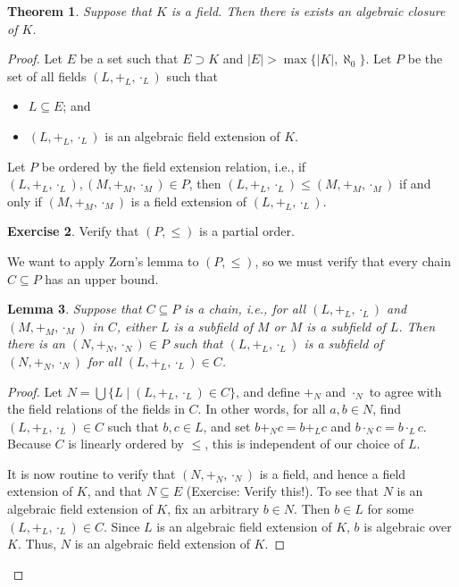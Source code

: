 \documentclass[a4paper]{memoir}
\newtheorem{theorem}{Theorem}[section]
\newtheorem{lemma}[theorem]{Lemma}
\theoremstyle{definition}
\newtheorem{exercise}[theorem]{Exercise}
\begin{document}
\begin{theorem}
  Suppose that $K$ is a field. Then there is exists an algebraic closure of $K$.
\end{theorem}

\begin{proof}
  Let $E$ be a set such that $E \supset K$ and $|E| > \max\{|K|, \aleph_0\}$. Let 
  $P$ be the set of all fields $(L, +_L, \cdot_L)$ such that
  \begin{itemize}
    \item $L \subseteq E$; and
    \item $(L, +_L, \cdot_L)$ is an algebraic field extension of $K$.
  \end{itemize}
  Let $P$ be ordered by the field extension relation, i.e., if 
  $(L, +_L, \cdot_L), (M, +_M, \cdot_M) \in P$, then $(L, +_L, \cdot_L) \leq 
  (M, +_M, \cdot_M)$ if and only if $(M, +_M, \cdot_M)$ is a field extension of 
  $(L, +_L, \cdot_L)$.
  
  \begin{exercise}
    Verify that $(P, \leq)$ is a partial order.
  \end{exercise}
  
  We want to apply Zorn's lemma to $(P, \leq)$, so we must verify that every 
  chain $C \subseteq P$ has an upper bound.
  
  \begin{lemma}
    Suppose that $C \subseteq P$ is a chain, i.e., for all $(L, +_L, \cdot_L)$ and 
    $(M, +_M, \cdot_M)$ in $C$, either $L$ is a subfield of $M$ or $M$ is a subfield of $L$.
    Then there is an $(N, +_N, \cdot_N) \in P$ such that 
    $(L, +_L, \cdot_L)$ is a subfield of $(N, +_N, \cdot_N)$ for all $(L, +_L, \cdot_L) \in C$.
  \end{lemma}
  
  \begin{proof}
    Let $N = \bigcup\{ L \mid (L, +_L, \cdot_L) \in C \}$, and define $+_N$ and $\cdot_N$ to 
    agree with the field relations of the fields in $C$. In other words, for all 
    $a,b \in N$, find $(L, +_L, \cdot_L) \in C$ such that $b,c \in L$, and set 
    $b +_N c = b +_L c$ and $b \cdot_N c = b \cdot_L c$. Because $C$ is linearly ordered 
    by $\leq$, this is independent of our choice of $L$. 
    
    It is now routine to verify that $(N, +_N, \cdot_N)$ is a field, and hence a field extension 
    of $K$, and that $N \subseteq E$ (Exercise: Verify this!). To see that $N$ is an 
    algebraic field extension of $K$, 
    fix an arbitrary $b \in N$. Then $b \in L$ for some $(L, +_L, \cdot_L) \in C$. Since 
    $L$ is an algebraic field extension of $K$, $b$ is algebraic over $K$. Thus, $N$ is an 
    algebraic field extension of $K$. 
    

\end{proof}
\end{proof}
\end{document}
